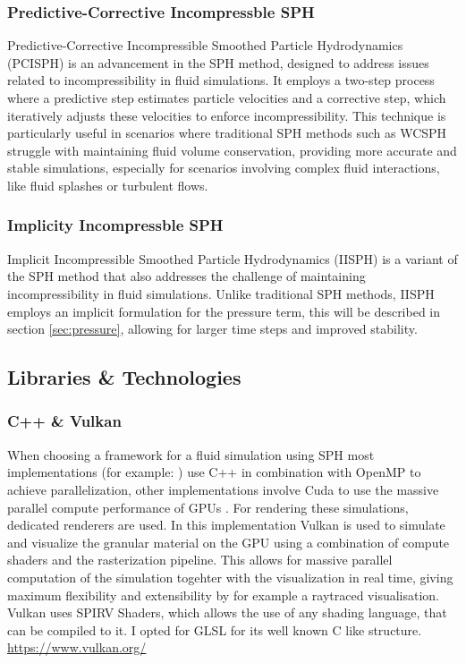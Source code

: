 \documentclass[intern]{cgMA}
\begin{document}
    \subsubsection*{Predictive-Corrective Incompressble SPH} 
    Predictive-Corrective Incompressible Smoothed Particle Hydrodynamics (PCISPH) is an advancement in the SPH method, designed to address issues related to incompressibility in fluid simulations. It employs a two-step process where a predictive step estimates particle velocities and a corrective step, which iteratively adjusts these velocities to enforce incompressibility. This technique is particularly useful in scenarios where traditional SPH methods such as WCSPH struggle with maintaining fluid volume conservation, providing more accurate and stable simulations, especially for scenarios involving complex fluid interactions, like fluid splashes or turbulent flows. \cite{10.1145/1576246.1531346}

    \subsubsection*{Implicity Incompressble SPH}
    Implicit Incompressible Smoothed Particle Hydrodynamics (IISPH) is a variant of the SPH method that also addresses the challenge of maintaining incompressibility in fluid simulations. Unlike traditional SPH methods, IISPH employs an implicit formulation for the pressure term, this will be described in section \ref{sec:pressure}, allowing for larger time steps and improved stability.\cite{6570475} %

        
    \subsection{Libraries \& Technologies}

    \subsubsection*{C++ \& Vulkan}
    When choosing a framework for a fluid simulation using SPH most implementations (for example: \cite{splishsplash} \cite{dualsphysics}) use C++ in combination with OpenMP to achieve parallelization, other implementations involve Cuda to use the massive parallel compute performance of GPUs \cite{dualsphysics}. For rendering these simulations, dedicated renderers are used. In this implementation Vulkan is used to simulate and visualize the granular material on the GPU using a combination of compute shaders and the rasterization pipeline. This allows for massive parallel computation of the simulation togehter with the visualization in real time, giving maximum flexibility and extensibility by for example a raytraced visualisation. Vulkan uses SPIRV Shaders, which allows the use of any shading language, that can be compiled to it. I opted for GLSL for its well known C like structure. \url{https://www.vulkan.org/}
\end{document}

